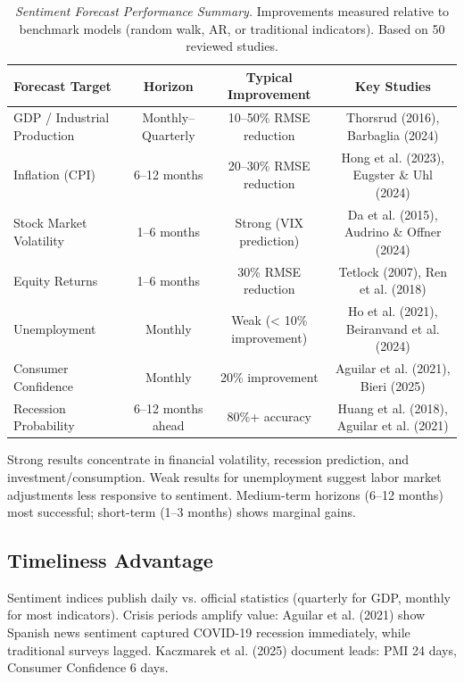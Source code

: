 \documentclass[11pt]{article}
\begin{document}
\begin{table}[H]
\centering
\small
\begin{tabular}{lccc}
\toprule
\textbf{Forecast Target} & \textbf{Horizon} & \textbf{Typical Improvement} & \textbf{Key Studies} \\
\midrule
GDP / Industrial Production & Monthly--Quarterly & 10--50\% RMSE reduction & Thorsrud (2016), Barbaglia (2024) \\
Inflation (CPI) & 6--12 months & 20--30\% RMSE reduction & Hong et al. (2023), Eugster \& Uhl (2024) \\
Stock Market Volatility & 1--6 months & Strong (VIX prediction) & Da et al. (2015), Audrino \& Offner (2024) \\
Equity Returns & 1--6 months & 30\% RMSE reduction & Tetlock (2007), Ren et al. (2018) \\
Unemployment & Monthly & Weak (< 10\% improvement) & Ho et al. (2021), Beiranvand et al. (2024) \\
Consumer Confidence & Monthly & 20\% improvement & Aguilar et al. (2021), Bieri (2025) \\
Recession Probability & 6--12 months ahead & 80\%+ accuracy & Huang et al. (2018), Aguilar et al. (2021) \\
\bottomrule
\end{tabular}
\caption{\textit{Sentiment Forecast Performance Summary.} Improvements measured relative to benchmark models (random walk, AR, or traditional indicators). Based on 50 reviewed studies.}
\label{tab:performance}
\end{table}

Strong results concentrate in financial volatility, recession prediction, and investment/consumption. Weak results for unemployment suggest labor market adjustments less responsive to sentiment. Medium-term horizons (6--12 months) most successful; short-term (1--3 months) shows marginal gains.

\subsection{Timeliness Advantage}

Sentiment indices publish daily vs. official statistics (quarterly for GDP, monthly for most indicators). Crisis periods amplify value: Aguilar et al. (2021) show Spanish news sentiment captured COVID-19 recession immediately, while traditional surveys lagged. Kaczmarek et al. (2025) document leads: PMI 24 days, Consumer Confidence 6 days.
\end{document}
